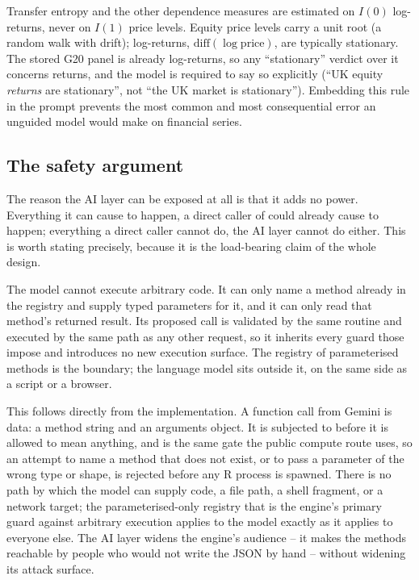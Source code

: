 \begin{principle}
\label{prin:stationarity}
Transfer entropy and the other dependence measures are estimated on $I(0)$ log-returns,
never on $I(1)$ price levels. Equity price levels carry a unit root (a random walk with
drift); log-returns, $\mathrm{diff}(\log \text{price})$, are typically stationary. The
stored G20 panel is already log-returns, so any ``stationary'' verdict over it concerns
returns, and the model is required to say so explicitly (``UK equity \emph{returns} are
stationary'', not ``the UK market is stationary''). Embedding this rule in the prompt
prevents the most common and most consequential error an unguided model would make on
financial series.
\end{principle}

\subsection{The safety argument}
\label{sec:ai-safety}

The reason the AI layer can be exposed at all is that it adds no power. Everything it
can cause to happen, a direct caller of  could already cause to
happen; everything a direct caller cannot do, the AI layer cannot do either. This is
worth stating precisely, because it is the load-bearing claim of the whole design.

\begin{invariant}
\label{inv:ai-client}
The model cannot execute arbitrary code. It can only name a method already in the
registry and supply typed parameters for it, and it can only read that method's
returned result. Its proposed call is validated by the same  routine
and executed by the same  path as any other request, so it
inherits every guard those impose and introduces no new execution surface. The
registry of parameterised methods is the boundary; the language model sits outside it,
on the same side as a script or a browser.
\end{invariant}

This follows directly from the implementation. A function call from Gemini is data: a
method string and an arguments object. It is subjected to  before it
is allowed to mean anything, and  is the same gate the public compute
route uses, so an attempt to name a method that does not exist, or to pass a parameter
of the wrong type or shape, is rejected before any R process is spawned. There is no
path by which the model can supply code, a file path, a shell fragment, or a network
target; the parameterised-only registry that is the engine's primary guard against
arbitrary execution applies to the model exactly as it applies to everyone else. The
AI layer widens the engine's audience -- it makes the methods reachable by people who
would not write the JSON by hand -- without widening its attack surface.

